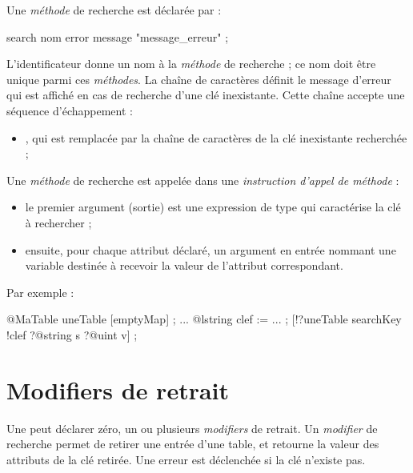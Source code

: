 Une \emph{méthode} de recherche est déclarée par :

\begin{galgascode}
search nom error message "message_erreur" ;
\end{galgascode}

L'identificateur  donne un nom à la \emph{méthode} de recherche ; ce nom doit être unique parmi ces \emph{méthodes}. La chaîne de caractères  définit le message d'erreur qui est affiché en cas de recherche d'une clé inexistante. Cette chaîne accepte une séquence d'échappement :
\begin{itemize}
  \item {}, qui est remplacée par la chaîne de caractères de la clé inexistante recherchée ;
\end{itemize}


Une \emph{méthode} de recherche est appelée dans une \emph{instruction d'appel de méthode} :
\begin{itemize}
  \item le premier argument (sortie) est une expression de type  qui caractérise la clé à rechercher ;
  \item ensuite, pour chaque attribut déclaré, un argument en entrée nommant une variable destinée à recevoir la valeur de l'attribut correspondant.
\end{itemize}

Par exemple :
\begin{galgascode}
@MaTable uneTable [emptyMap] ;
...
@lstring clef := ... ;
[!?uneTable searchKey !clef ?@string s ?@uint v] ;
\end{galgascode}













\section{Modifiers de retrait}

Une  peut déclarer zéro, un ou plusieurs \emph{modifiers} de retrait. Un \emph{modifier} de recherche permet de retirer une entrée d'une table, et retourne la valeur des attributs de la clé retirée. Une erreur est déclenchée si la clé n'existe pas.


